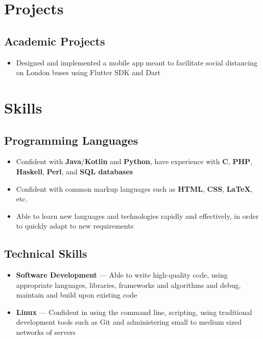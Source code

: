 \documentclass[a4paper]{article}
\begin{document}
\section*{Projects}

\subsection*{Academic Projects}
\begin{itemize}
	\item Designed and implemented a mobile app meant to facilitate social distancing on London buses using Flutter SDK and Dart
\end{itemize}

\section*{Skills}

\subsection*{Programming Languages}
\begin{itemize}
	\item Confident with \textbf{Java}/\textbf{Kotlin} and \textbf{Python}, have experience with \textbf{C},
	      \textbf{PHP}, \textbf{Haskell}, \textbf{Perl}, and \textbf{SQL databases}
	\item Confident with common markup languages such as \textbf{HTML},
	      \textbf{CSS}, \textbf{{\LaTeX}}, etc.
	\item Able to learn new languages and technologies rapidly and effectively,
	      in order to quickly adapt to new requirements
\end{itemize}

\subsection*{Technical Skills}
\begin{itemize}
	\item \textbf{Software Development} --- Able to write high-quality code, using
	      appropriate languages, libraries, frameworks and algorithms and debug,
	      maintain and build upon existing code
	\item \textbf{Linux} --- Confident in using the command line, scripting, using
	      traditional development tools such as Git and administering small to
	      medium sized networks of servers
\end{itemize}
\end{document}
